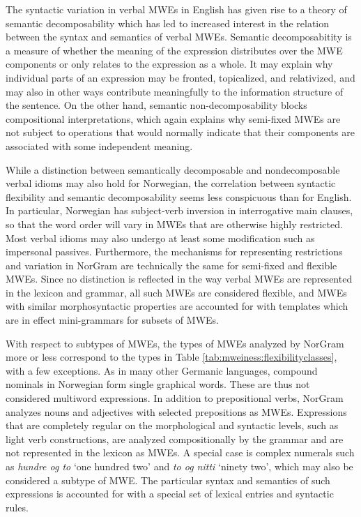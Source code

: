 \documentclass[output=paper]{langsci/langscibook}
\begin{document}
The syntactic variation in verbal MWEs in English has given rise to a theory of semantic decomposability \citep{nunberg94} which has led to increased interest in the relation between the syntax and semantics of verbal MWEs.
Semantic decomposabitity is a measure of whether the meaning of the expression distributes over the MWE components or only relates to the expression as a whole.
It may explain why individual parts of an expression may be fronted, topicalized, and relativized, and may also in other ways contribute meaningfully to the information structure of the sentence.
On the other hand, semantic non-decomposability blocks compositional interpretations, which again explains why semi-fixed MWEs are not subject to operations that would normally indicate that their components are associated with some independent meaning.

While a distinction between semantically decomposable and nondecomposable verbal idioms may also hold for Norwegian, the correlation between syntactic flexibility and semantic decomposability seems less conspicuous than for English. 
In particular, Norwegian has subject-verb inversion in interrogative main clauses, so that the word order will vary in MWEs that are otherwise highly restricted. 
Most verbal idioms may also undergo at least some modification such as impersonal passives.
Furthermore, the mechanisms for representing restrictions and variation in NorGram are technically the same for semi-fixed and flexible MWEs. 
Since no distinction is reflected in the way verbal MWEs are represented in the lexicon and grammar, all such MWEs are considered flexible, 
and MWEs with similar morphosyntactic properties are accounted for with templates which are in effect mini-grammars for subsets of MWEs.

With respect to subtypes of MWEs, the types of MWEs analyzed by NorGram more or less correspond to the types in Table \ref{tab:mweiness:flexibilityclasses}, with a few exceptions. 
As in many other Germanic languages, compound nominals in Norwegian form single graphical words. 
These are thus not considered multiword expressions.
In addition to prepositional verbs, NorGram analyzes nouns and adjectives with selected prepositions as MWEs.
Expressions that are completely regular on the morphological and syntactic levels, such as light verb constructions, are analyzed compositionally by the grammar and are not represented in the lexicon as MWEs.
A special case is complex numerals such as \emph{hundre og to} `one hundred two' and  \emph{to og nitti} `ninety two', which may also be considered a subtype of MWE.
The particular syntax and semantics of such expressions is accounted for with a special set of lexical entries and syntactic rules.
\end{document}

